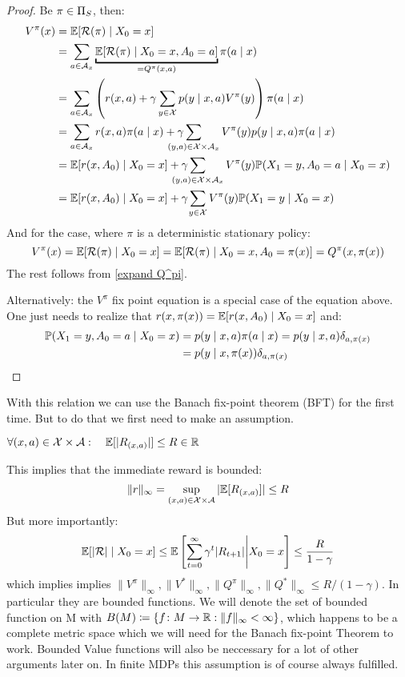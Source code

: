 \begin{proof} Be \(\pi\in\statPolicy\), then:
	\begin{align}
		V^\pi(x)&=\E[\cR(\pi)\mid X_0=x] \nonumber\\
		&=\sum_{a\in\cA_x} 
		\underbracket{\E[\cR(\pi)\mid X_0=x, A_0=a]}_{=Q^\pi(x,a)}\label{stoch pi: V^pi in terms of Q^pi}
		\pi(a\mid x)\\
		&=\sum_{a\in\cA_x} \left(r(x,a)
		+\gamma\sum_{y\in\cX}p(y\mid x,a)V^\pi(y)\right)\pi(a\mid x)\nonumber\\
		&=\sum_{a\in\cA_x}r(x,a)\pi(a\mid x) 
		+ \gamma\smashoperator[l]{\sum_{(y,a)\in\cX\times\cA_x}} 
		V^\pi(y) p(y\mid x,a)\pi(a\mid x)
		\label{stoch pi: fixpoint proof}\\
		&=\E[r(x,A_0)\mid X_0=x] 
		+ \gamma\smashoperator[l]{\sum_{(y,a)\in\cX\times\cA_x}} V^\pi(y)
		\Pr(X_1=y, A_0=a \mid X_0=x)\nonumber\\
		&=\E[r(x,A_0)\mid X_0=x] + \gamma\smashoperator[l]{\sum_{y\in\cX}} V^\pi(y)
		\Pr(X_1=y\mid X_0=x)\nonumber
	\end{align}
	And for the case, where \(\pi\) is a deterministic stationary policy:
	\[
		V^\pi(x)=\E[\cR(\pi)\mid X_0=x]=\E[\cR(\pi)\mid X_0=x, A_0=\pi(x)]=Q^\pi(x,\pi(x))
	\]
	The rest follows from \ref{expand Q^pi}. 
	
	Alternatively: the \(V^\pi\) fix point equation is a special case of the equation above. One just needs to realize that \(r(x,\pi(x)) = \E[r(x,A_0)\mid X_0=x]\) and:
	\begin{align*}
		\Pr(X_1=y,A_0=a\mid X_0=x)
		&=p(y\mid x,a)\pi(a\mid x)=p(y\mid x,a) \delta_{a,\pi(x)}\\
		&=p(y\mid x,\pi(x)) \delta_{a,\pi(x)}\qedhere
	\end{align*}
\end{proof}

With this relation we can use the Banach fix-point theorem (BFT) for the first time. But to do that we first need to make an assumption.
\begin{assumption} 
	\(\forall (x,a)\in\cX\times\cA:\quad\E[|R_{(x,a)}|]\le R\in\R\)
\end{assumption}
This implies that the immediate reward is bounded:
\[
	\|r\|_{\infty}=\sup_{(x,a)\in\cX\times\cA}|\E[R_{(x,a)}]|\le R
\]
But more importantly:
\[
	\E[|\cR| \mid X_0 = x]\le\E\left[\sum_{t=0}^\infty \gamma^t |R_{t+1}| \middle| X_0=x \right]
	\le \frac{R}{1-\gamma} 
\]
which implies implies \(\|V^\pi\|_\infty,\|V^*\|_\infty, \|Q^\pi\|_\infty,\|Q^*\|_\infty \le R/(1-\gamma)\). In particular they are bounded functions. We will denote the set of bounded function on M with \(B(M)\coloneqq \{f\colon M\to\R : \|f\|_\infty <\infty \} \), which happens to be a complete metric space which we will need for the Banach fix-point Theorem to work. Bounded Value functions will also be neccessary for a lot of other arguments later on. In finite MDPs this assumption is of course always fulfilled. 


